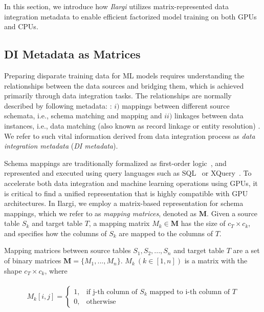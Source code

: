 In this section, we introduce how \emph{Ilargi} utilizes matrix-represented data integration metadata to enable efficient factorized model training on both GPUs and CPUs. 


 





\vspace{-3mm}
\subsection{DI Metadata as Matrices} 
\label{sec:matrixGen}
\vspace{-2mm}
Preparing disparate training data for ML models requires understanding the relationships between the data sources and bridging them, which is achieved primarily through data integration tasks. The relationships are normally described by following metadata: \cite{doan2012principles}: $i)$ mappings between different source schemata, i.e., schema matching and mapping \cite{rahm2001survey, fagin2009clio} and $ii)$ linkages between data instances, i.e., data matching (also known as record linkage or entity resolution)  \cite{brizan2006survey}. 
We refer to such vital information derived from data integration process as \emph{data integration metadata} (\textit{DI metadata}).

Schema mappings are traditionally formalized as first-order logic~\cite{fagin2009}, and represented and executed using query languages such as SQL~\cite{yan2001data} or XQuery~\cite{fagin2009clio}. To accelerate both data integration and machine learning operations using GPUs, it is critical to find a unified representation that is highly compatible with GPU architectures.
In Ilargi, we employ a matrix-based representation for schema mappings, which we refer to as \emph{mapping matrices}, denoted as $\mathbf{M}$. Given a source table $S_k$ and target table $T$, a mapping matrix $M_k \in \mathbf{M}$ has the size of  $c_T \times c_{k}$, and specifies how the columns of $S_k$ are mapped to the columns of $T$. 

\begin{definition} Mapping matrices between source tables $S_1, S_2, ..., S_n$ and target table $T$ are a set of binary matrices $\mathbf{M}= \{M_1, ..., M_n\}$. $M_k \ (k\in [1, n])$ is a matrix with the shape $c_{T} \times c_{k}$, where  

\small{
		\begin{align*}
			\begin{split} 
M_k[i,j] =  \begin{cases}1, &\text{if j-th column of $S_k$ mapped to i-th column of } T\\0, & \text{otherwise}\end{cases}
			\end{split}
		\end{align*}
	}
	\label{def:mm}
 
\end{definition}

